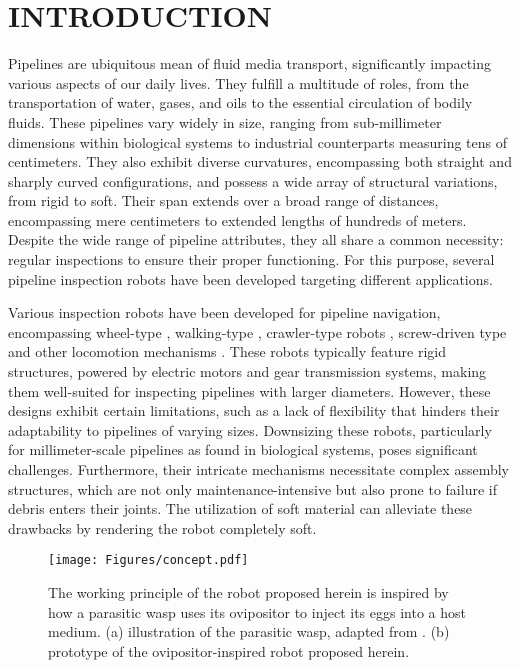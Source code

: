 \documentclass[letterpaper, 10 pt, conference]{ieeeconf}  %
\begin{document}
\section{INTRODUCTION}
Pipelines are ubiquitous mean of fluid media transport, significantly impacting various aspects of our daily lives. They fulfill a multitude of roles, from the transportation of water, gases, and oils to the essential circulation of bodily fluids. These pipelines vary widely in size, ranging from sub-millimeter dimensions within biological systems to industrial counterparts measuring tens of centimeters. They also exhibit diverse curvatures, encompassing both straight and sharply curved configurations, and possess a wide array of structural variations, from rigid to soft. Their span extends over a broad range of distances, encompassing mere centimeters to extended lengths of hundreds of meters.  Despite the wide range of pipeline attributes, they all share a common necessity: regular inspections to ensure their proper functioning. For this purpose, several pipeline inspection robots have been developed targeting different applications.

Various inspection robots have been developed for pipeline navigation, encompassing wheel-type \cite{CHOI,kim}, walking-type \cite{Zagler}, crawler-type robots \cite{XU}, screw-driven type \cite{kakogawa} and other locomotion mechanisms \cite{Yeh,ismail}. These robots typically feature rigid structures, powered by electric motors and gear transmission systems, making them well-suited for inspecting pipelines with larger diameters. However, these designs exhibit certain limitations, such as a lack of flexibility that hinders their adaptability to pipelines of varying sizes. Downsizing these robots, particularly for millimeter-scale pipelines as found in biological systems, poses significant challenges. Furthermore, their intricate mechanisms necessitate complex assembly structures, which are not only maintenance-intensive but also prone to failure if debris enters their joints. The utilization of soft material can alleviate these drawbacks by rendering the robot completely soft.

\begin{figure}
    \centering
    \texttt{[image: Figures/concept.pdf]}
    \caption{The working principle of the robot proposed herein is inspired by how a parasitic wasp uses its ovipositor to inject its eggs into a host medium. (a) illustration of the parasitic wasp, adapted from \cite{esther}. (b) prototype of the ovipositor-inspired robot proposed herein.}
    \label{fig:figure1}
\end{figure}
\end{document}
